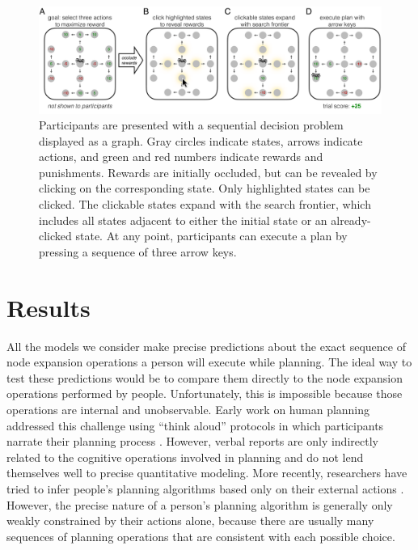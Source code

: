 \begin{figure}[t!]
    \centering
    \includegraphics[width=\textwidth]{figs/planning/fig2.pdf}
    \caption{
     Participants are presented with a sequential decision problem displayed as a graph. Gray circles indicate states, arrows indicate actions, and green and red numbers indicate rewards and punishments.
     Rewards are initially occluded, but can be revealed by clicking on the corresponding state. Only highlighted states can be clicked.
     The clickable states expand with the search frontier, which includes all states adjacent to either the initial state or an already-clicked state.
     At any point, participants can execute a plan by pressing a sequence of three arrow keys.}
    \label{fig:planning-task}
\end{figure}

\section{Results}\label{sec:planning-results}

All the models we consider make precise predictions about the exact sequence of node expansion operations a person will execute while planning. The ideal way to test these predictions would be to compare them directly to the node expansion operations performed by people. Unfortunately, this is impossible because those operations are internal and unobservable. Early work on human planning addressed this challenge using ``think aloud'' protocols in which participants narrate their planning process \citep{degroot1965thought,newell1972human,chase1973perception}. However, verbal reports are only indirectly related to the cognitive operations involved in planning and do not lend themselves well to precise quantitative modeling. More recently, researchers have tried to infer people's planning algorithms based only on their external actions \citep{huys2012bonsai,huys2015interplay,daw2005uncertaintybased,solway2015evidence,snider2015prospective,vanopheusden2017computational}. However, the precise nature of a person's planning algorithm is generally only weakly constrained by their actions alone, because there are usually many sequences of planning operations that are consistent with each possible choice. 

